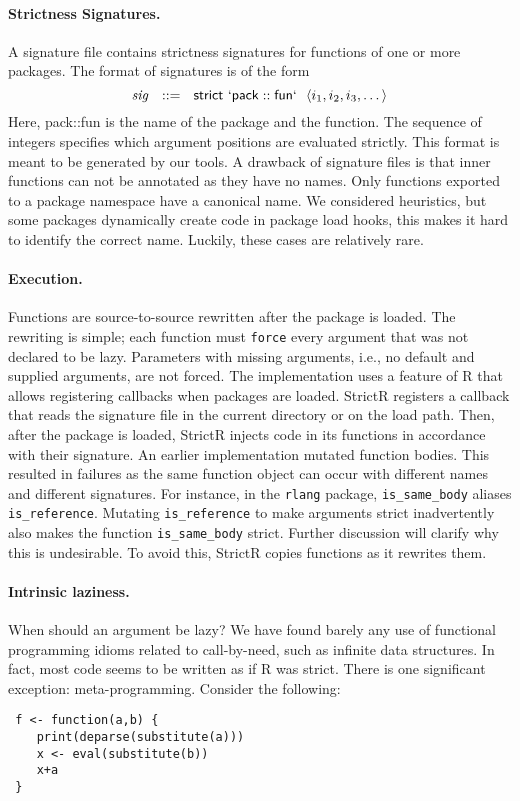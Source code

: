 \documentclass[screen,acmsmall]{acmart}
\renewcommand{\c}[1]{\lstinline |#1|\xspace}
\newcommand{\strictr}{{\sf StrictR}\xspace}
\begin{document}
\paragraph{Strictness Signatures.}
A signature file contains strictness signatures for functions of one or more
packages. The format of signatures is of the form
%
\[
\mathit{sig}~~::=~~\mathsf{strict}~\mathsf{`pack}::\mathsf{fun`}~~\langle i_1,
i_2, i_3, \dots\rangle
\]
%
Here, {\sf pack::fun} is the name of the package and the function. The sequence
of integers specifies which argument positions are evaluated strictly. This
format is meant to be generated by our tools. A drawback of signature files is
that inner functions can not be annotated as they have no names. Only functions
exported to a package namespace have a canonical name. We considered heuristics,
but some packages dynamically create code in package load hooks, this makes it
hard to identify the correct name. Luckily, these cases are relatively rare.

\paragraph{Execution.}
Functions are source-to-source rewritten after the package is loaded. The
rewriting is simple; each function must \c{force} every argument that was not
declared to be lazy. Parameters with missing arguments, i.e., no default and
supplied arguments, are not forced. The implementation uses a feature of R that
allows registering callbacks when packages are loaded. \strictr registers a
callback that reads the signature file in the current directory or on the load
path. Then, after the package is loaded, \strictr injects code in its functions
in accordance with their signature. An earlier implementation mutated function
bodies. This resulted in failures as the same function object can occur with
different names and different signatures. For instance, in the \c{rlang}
package, \c{is_same_body} aliases \c{is_reference}. Mutating \c{is_reference} to
make arguments strict inadvertently also makes the function \c{is_same_body}
strict. Further discussion will clarify why this is undesirable. To avoid this,
\strictr copies functions as it rewrites them.
\newpage
\paragraph{Intrinsic laziness.} When should an  argument be lazy?
We have found barely any use of functional programming idioms related to
call-by-need, such as infinite data structures. In fact, most code seems to be
written as if R was strict. There is one significant exception:
meta-programming. Consider the following:
\begin{lstlisting}
 f <- function(a,b) {
    print(deparse(substitute(a)))
    x <- eval(substitute(b))
    x+a
 }
\end{lstlisting}
\end{document}
